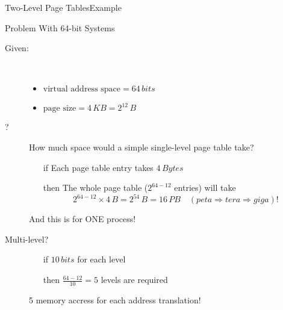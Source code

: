 \begin{frame}{Two-Level Page Tables}{Example}
  \begin{center}
  \end{center}
\end{frame}

\begin{frame}{Problem With 64-bit Systems}
  \begin{description}
  \item[Given:]\hfill\\[-2ex]
    \begin{itemize}
    \item $\text{virtual address space} = 64\,bits$
    \item $\text{page size}=4\,KB=2^{12}\,B$
    \end{itemize}
  \item[?] How much space would a simple single-level page table take?
    \begin{itemize}
    \item[if] Each page table entry takes $4\,Bytes$
    \item[then] The whole page table ($2^{64-12}$ entries) will take
      \[2^{64-12}\times{}4\,B=2^{54}\,B=16\,PB \quad {\scriptstyle(peta \Rightarrow tera \Rightarrow giga)!}\]
    \end{itemize}
    And this is for ONE process!
  \item[Multi-level?]\hfill
    \begin{itemize}
    \item[if] $10\,bits$ for each level
    \item[then] $\frac{64-12}{10}=5$ levels are required
    \end{itemize}
    5 memory accress for each address translation!
  \end{description}
\end{frame}


